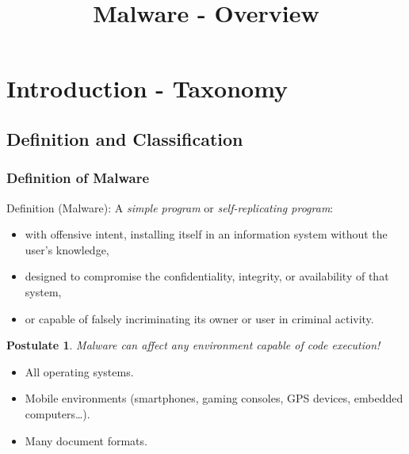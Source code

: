 \documentclass{beamer}
\title{Malware - Overview}
\newtheorem{deft}{Definition}
\newtheorem{postulat}{Postulate}
\newcommand{\enlight}[1]{\textit{\color{blue}#1}}
\begin{document}
\maketitle


\section{Introduction - Taxonomy}

\subsection{Definition and Classification}



\begin{frame}
\frametitle{Definition of Malware}

 \begin{block}{Definition (Malware):}
  A \enlight{simple program} or \enlight{self-replicating program}:
\begin{itemize}
\item  with offensive intent, installing itself in an information system without the user's knowledge,
\item designed to compromise the confidentiality, integrity, or availability of that system,
  \item or capable of falsely incriminating its owner or user in criminal activity.
\end{itemize}
\end{block}

\end{frame}



\begin{frame}

\begin{postulat}
Malware can affect any environment capable of code execution!
\end{postulat}

\begin{itemize}
\item All operating systems.
\item Mobile environments (smartphones, gaming consoles, GPS devices, embedded computers\ldots).
\item Many document formats.
\end{itemize}
\end{frame}
\end{document}
